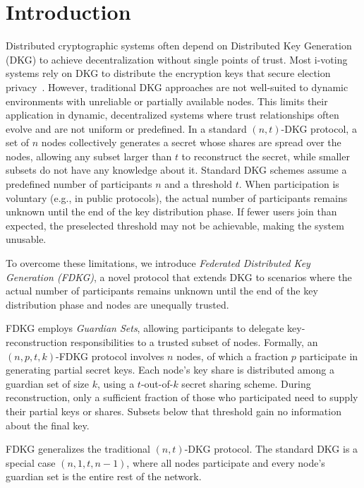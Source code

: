 \documentclass[lettersize,journal]{IEEEtran}
\theoremstyle{definition}
\begin{document}
\section{Introduction}

Distributed cryptographic systems often depend on Distributed Key Generation (DKG) to achieve decentralization without single points of trust. Most i-voting systems rely on DKG to distribute the encryption keys that secure election privacy~\cite{baranskiTrustCentricApproachQuantifying2024}. However, traditional DKG approaches are not well-suited to dynamic environments with unreliable or partially available nodes. This limits their application in dynamic, decentralized systems where trust relationships often evolve and are not uniform or predefined. 
In a standard $(n, t)$-DKG protocol, a set of $n$ nodes collectively generates a secret whose shares are spread over the nodes, allowing any subset larger than $t$ to reconstruct the secret, while smaller subsets do not have any knowledge about it.
Standard DKG schemes assume a predefined number of participants $n$ and a threshold $t$. 
When participation is voluntary (e.g., in public protocols), the actual number of participants remains unknown until the end of the key distribution phase. If fewer users join than expected, the preselected threshold may not be achievable, making the system unusable.

To overcome these limitations, we introduce \emph{Federated Distributed Key Generation (FDKG)}, a novel protocol that extends DKG to scenarios where the actual number of participants remains unknown until the end of the key distribution phase and nodes are  unequally trusted. 

FDKG employs \emph{Guardian Sets}, allowing participants to delegate key-reconstruction responsibilities to a trusted subset of nodes. Formally, an $(n, p, t, k)$-FDKG protocol involves $n$ nodes, of which a fraction $p$ participate in generating partial secret keys. Each node’s key share is distributed among a guardian set of size $k$, using a $t$-out-of-$k$ secret sharing scheme. During reconstruction, only a sufficient fraction of those who participated need to supply their partial keys or shares. Subsets below that threshold gain no information about the final key.

FDKG generalizes the traditional $(n, t)$-DKG protocol. The standard DKG is a special case $(n, 1, t, n-1)$, where all nodes participate and every node’s guardian set is the entire rest of the network.
\end{document}
